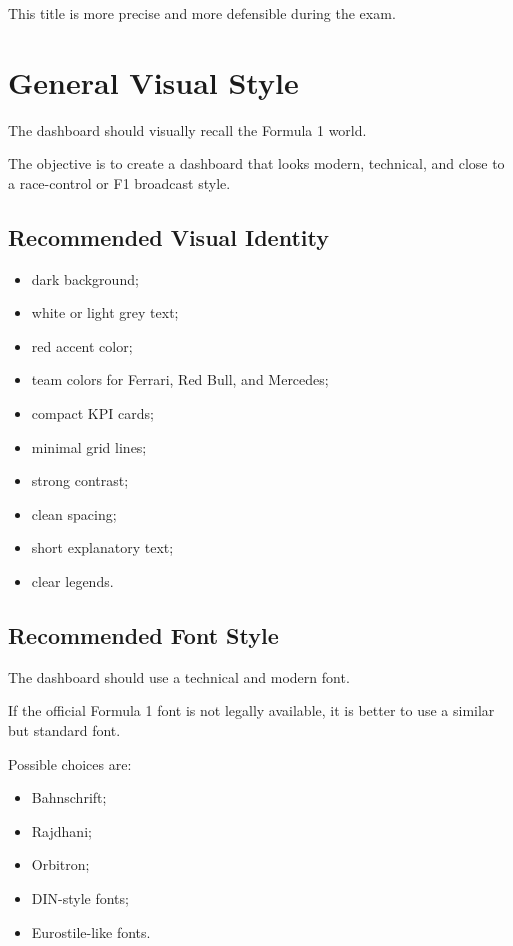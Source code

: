 \documentclass[12pt,a4paper]{article}
\begin{document}
	This title is more precise and more defensible during the exam.
	
	\section{General Visual Style}
	
	The dashboard should visually recall the Formula 1 world.
	
	The objective is to create a dashboard that looks modern, technical, and close to a race-control or F1 broadcast style.
	
	\subsection{Recommended Visual Identity}
	
	\begin{itemize}[leftmargin=1.2cm]
		\item dark background;
		\item white or light grey text;
		\item red accent color;
		\item team colors for Ferrari, Red Bull, and Mercedes;
		\item compact KPI cards;
		\item minimal grid lines;
		\item strong contrast;
		\item clean spacing;
		\item short explanatory text;
		\item clear legends.
	\end{itemize}
	
	\subsection{Recommended Font Style}
	
	The dashboard should use a technical and modern font.
	
	If the official Formula 1 font is not legally available, it is better to use a similar but standard font.
	
	Possible choices are:
	
	\begin{itemize}[leftmargin=1.2cm]
		\item Bahnschrift;
		\item Rajdhani;
		\item Orbitron;
		\item DIN-style fonts;
		\item Eurostile-like fonts.
	\end{itemize}
	
\end{document}
